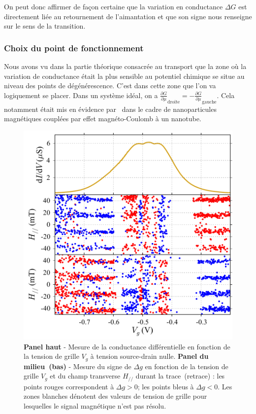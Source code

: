On peut donc affirmer de façon certaine que la variation en conductance $\Delta G$ est directement liée au retournement de l'aimantation et que son signe nous renseigne sur le sens de la transition.


\subsubsection{Choix du point de fonctionnement}
Nous avons vu dans la partie théorique consacrée au transport que la zone où la variation de conductance était la plus sensible au potentiel chimique se situe au niveau des points de dégénérescence. C'est dans cette zone que l'on va logiquement se placer. Dans un système idéal, on a $\frac{\partial G}{\partial \mu}_{\text{droite}} = -\frac{\partial G}{\partial \mu}_{\text{gauche}} $. Cela notamment était mis en évidence par~\cite{Datta2011} dans le cadre de nanoparticules magnétiques couplées par effet magnéto-Coulomb à un nanotube.

\begin{figure}
\parbox{7cm}{
\includegraphics[scale=0.45]{Resultats/PointFonct/PointFonct.pdf} 
}
\parbox{6.5cm}{\caption{\textbf{Panel haut} - Mesure de la conductance différentielle en fonction de la tension de grille $V_g$ à tension source-drain nulle. \textbf{Panel du milieu~(bas)} - Mesure du signe de $\Delta g$ en fonction de la tension de grille $V_g$ et du champ transverse $H_{//}$ durant la trace~(retrace) : les points rouges correspondent à $\Delta g >0$; les points bleus à $\Delta g <0$. Les zones blanches dénotent des valeurs de tension de grille pour lesquelles le signal magnétique n'est pas résolu.}
\label{point_fonctio}
}
\end{figure}

